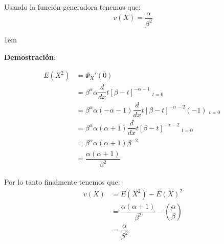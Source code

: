 \documentclass[12pt, fleqn]{report}                             %
\newenvironment{SmallIndentation}[1][0.75em]                    %
        {\begin{adjustwidth}{#1}{}\begin{footnotesize}}             %
        {\end{footnotesize}\end{adjustwidth}}                       %
\theoremstyle{break}                                            %
\newcommand{\Wrap}[1]           {\left( #1 \right)}             %
\newcommand \MiniDerivate[1][x]   {\dfrac{d}{d #1}}             %
\DeclareMathOperator \Evaluate  {\Big|}                         %
\begin{document}
                Usando la función generadora tenemos que:
                \begin{equation*}
                    v(X) = \dfrac{\alpha}{\beta^2}
                \end{equation*}

                \begin{SmallIndentation}[1em]
                    \textbf{Demostración}:
                    
                    \begin{align*}
                        E(X^2)
                            &= \Psi_X'(0)               \\
                            &=  \beta^\alpha \alpha 
                                    \MiniDerivate{t} [\beta - t]^{-\alpha -1} \Evaluate_{t = 0}         \\
                            &= \beta^\alpha \alpha (-\alpha -1) 
                                    \MiniDerivate{t} [\beta - t]^{-\alpha -2}(-1) \Evaluate_{t = 0}     \\
                            &= \beta^\alpha \alpha (\alpha+1) 
                                    \MiniDerivate{t} [\beta - t]^{-\alpha -2} \Evaluate_{t = 0}         \\
                            &= \beta^\alpha \alpha (\alpha+1) 
                                    \beta^{-2}                                                          \\
                            &= \dfrac{\alpha(\alpha + 1)}{\beta^2}
                    \end{align*}

                    Por lo tanto finalmente tenemos que:
                    \begin{align*}
                        v(X)
                            &= E(X^2) - E(X)^2                                                                \\
                            &= \dfrac{\alpha(\alpha + 1)}{\beta^2} - \Wrap{\dfrac{\alpha}{\beta}}             \\
                            &= \dfrac{\alpha}{\beta^2}
                    \end{align*}
                
                \end{SmallIndentation}



            \clearpage
\end{document}
